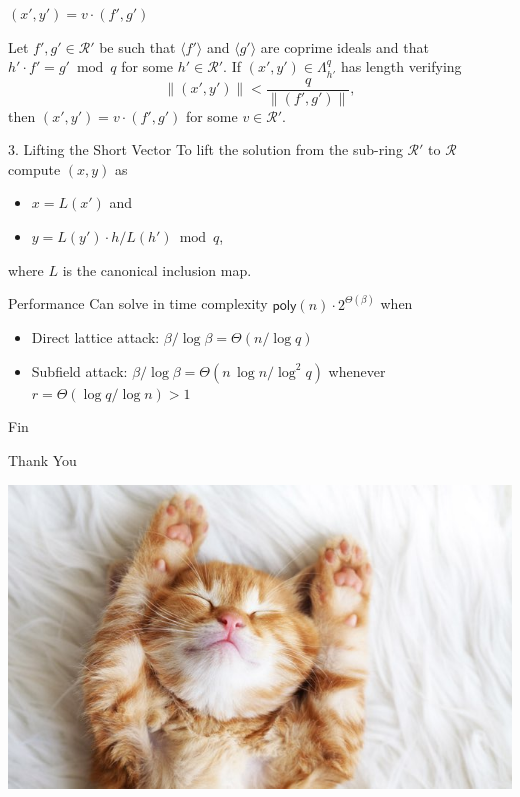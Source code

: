\documentclass[presentation,smaller]{beamer}
\newcommand{\cR}{\ensuremath{\mathcal{R}}\xspace}
\begin{document}
\begin{frame}[label={sec:org3e091a9}]{\((x',y') = v ⋅ (f',g')\)}
\begin{theorem}
Let \(f',g' \in \cR'\) be such that \(⟨ f'⟩\) and \(⟨ g'⟩\) are coprime ideals and that \(h'⋅ f' = g' \bmod q\) for some \(h' \in \cR'\). If \((x',y') \in Λ_{h'}^q\) has length verifying
\[\|(x',y') \| < \frac q {\|(f',g')\|},\]
then \((x',y') = v ⋅ (f',g')\) for some \(v ∈ \cR'\).
\end{theorem}
\end{frame}

\begin{frame}[label={sec:orgc1dc521}]{3. Lifting the Short Vector}
To lift the solution from the sub-ring \(\cR'\) to \(\cR\) compute \((x,y)\) as
\begin{itemize}
\item \(x = L(x')\)  and
\item \(y = L(y') ⋅ h / L(h') \bmod q\),
\end{itemize}
where \(L\) is the canonical inclusion map.
\end{frame}

\begin{frame}[label={sec:orgb72b3c8}]{Performance}
Can solve in time complexity \(\mathsf{poly}(n ) \cdot 2^{\Theta(\beta)}\) when

\begin{itemize}[<+->]
\item \alert{Direct lattice attack}: \(\beta / \log \beta = \Theta\left( n / \log q \right)\)
\item \alert{Subfield attack}: \(\beta / \log \beta = \Theta\left( n\, \log n / \log^2 q \right)\) whenever \(r = \Theta(\log q / \log n) > 1\)
\end{itemize}
\end{frame}


\begin{frame}[standout,label={sec:orga3c47bc}]{Fin}
\begin{center}
\Huge \alert{Thank You}
\end{center}

\begin{center}
\includegraphics[width=0.6\paperwidth]{./kitten-04.jpg}
\end{center}
\end{frame}
\end{document}
